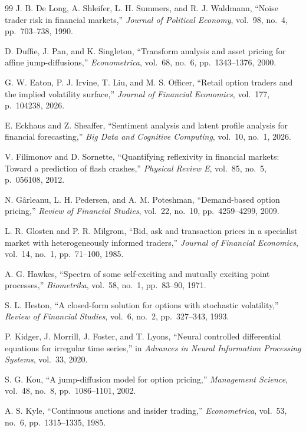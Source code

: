 \documentclass[10pt,twocolumn]{article}
\begin{document}
\begin{thebibliography}{99}
J. B. De Long, A. Shleifer, L. H. Summers, and R. J. Waldmann,
``Noise trader risk in financial markets,''
\textit{Journal of Political Economy}, vol.~98, no.~4, pp.~703--738, 1990.

D. Duffie, J. Pan, and K. Singleton,
``Transform analysis and asset pricing for affine jump-diffusions,''
\textit{Econometrica}, vol.~68, no.~6, pp.~1343--1376, 2000.

G. W. Eaton, P. J. Irvine, T. Liu, and M. S. Officer,
``Retail option traders and the implied volatility surface,''
\textit{Journal of Financial Economics}, vol.~177, p.~104238, 2026.

E. Eckhaus and Z. Sheaffer,
``Sentiment analysis and latent profile analysis for financial forecasting,''
\textit{Big Data and Cognitive Computing}, vol.~10, no.~1, 2026.

V. Filimonov and D. Sornette,
``Quantifying reflexivity in financial markets: Toward a prediction of flash crashes,''
\textit{Physical Review E}, vol.~85, no.~5, p.~056108, 2012.

N. G\^{a}rleanu, L. H. Pedersen, and A. M. Poteshman,
``Demand-based option pricing,''
\textit{Review of Financial Studies}, vol.~22, no.~10, pp.~4259--4299, 2009.

L. R. Glosten and P. R. Milgrom,
``Bid, ask and transaction prices in a specialist market with heterogeneously informed traders,''
\textit{Journal of Financial Economics}, vol.~14, no.~1, pp.~71--100, 1985.

A. G. Hawkes,
``Spectra of some self-exciting and mutually exciting point processes,''
\textit{Biometrika}, vol.~58, no.~1, pp.~83--90, 1971.

S. L. Heston,
``A closed-form solution for options with stochastic volatility,''
\textit{Review of Financial Studies}, vol.~6, no.~2, pp.~327--343, 1993.

P. Kidger, J. Morrill, J. Foster, and T. Lyons,
``Neural controlled differential equations for irregular time series,''
in \textit{Advances in Neural Information Processing Systems}, vol.~33, 2020.

S. G. Kou,
``A jump-diffusion model for option pricing,''
\textit{Management Science}, vol.~48, no.~8, pp.~1086--1101, 2002.

A. S. Kyle,
``Continuous auctions and insider trading,''
\textit{Econometrica}, vol.~53, no.~6, pp.~1315--1335, 1985.


\end{thebibliography}
\end{document}
